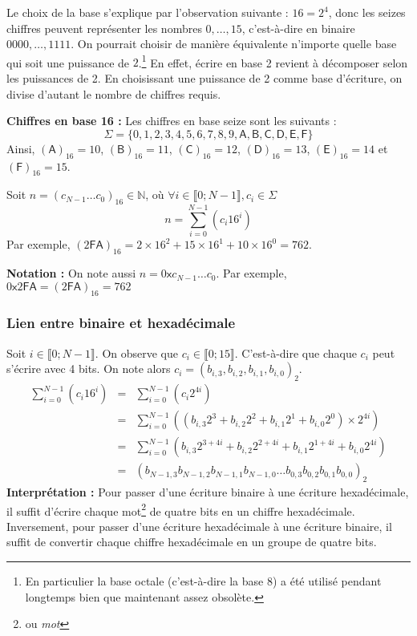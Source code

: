 \documentclass[../../main.tex]{subfiles}
\begin{document}
Le choix de la base s'explique par l'observation suivante : $16 = 2^{4}$, donc les seizes chiffres peuvent représenter les nombres $0, \dots, 15$, c'est-à-dire en binaire $0000, \dots, 1111$. On pourrait choisir de manière équivalente n'importe quelle base qui soit une puissance de $2$.\footnote{En particulier la base octale (c'est-à-dire la base 8) a été utilisé pendant longtemps bien que maintenant assez obsolète.} En effet, écrire en base 2 revient à décomposer selon les puissances de 2. En choisissant une puissance de 2 comme base d'écriture, on divise d'autant le nombre de chiffres requis.

\textbf{Chiffres en base 16 :} Les chiffres en base seize sont les suivants :
$$\Sigma = \{0, 1, 2, 3, 4, 5, 6, 7, 8, 9, \textsf{A}, \textsf{B}, \textsf{C}, \textsf{D}, \textsf{E}, \textsf{F}\}$$
Ainsi, $(\textsf{A})_{16} = 10$, $(\textsf{B})_{16} = 11$, $(\textsf{C})_{16} = 12$, $(\textsf{D})_{16} = 13$, $(\textsf{E})_{16} = 14$ et $(\textsf{F})_{16} = 15$.

Soit $n = (c_{N-1}\dots c_{0})_{16}\in{\mathbb{N}}$, où $\forall{i\in{\llbracket0; N-1\rrbracket}}, c_{i}\in{\Sigma}$
$$n = \displaystyle\sum_{i = 0}^{N-1}\left(c_{i}16^{i}\right)$$ 
Par exemple, $(2\textsf{FA})_{16} = 2\times{16^{2}} + 15\times{16^{1}} + 10\times{16^{0}} = 762$.

\textbf{Notation :} On note aussi $n = 0\textsf{x}c_{N-1}\dots c_{0}$. Par exemple, $0\textsf{x}2\textsf{FA} = (2\textsf{FA})_{16} = 762$

\subsubsection{Lien entre binaire et hexadécimale} \label{ssub:lien_entre_binaire_et_hexad_cimale}

Soit $i\in{\llbracket 0; N-1\rrbracket}$. On observe que $c_{i}\in{\llbracket 0; 15\rrbracket}$. C'est-à-dire que chaque $c_{i}$ peut s'écrire avec 4 bits. On note alors $c_{i} = (b_{i, 3}, b_{i, 2}, b_{i, 1}, b_{i, 0})_{2}$.
$$
\begin{array}{lcl}
\displaystyle\sum_{i = 0}^{N-1}\left(c_{i}16^{i}\right) & = & \displaystyle\sum_{i = 0}^{N-1}\left(c_{i}2^{4i}\right) \\
 & = & \displaystyle\sum_{i = 0}^{N-1}\left((b_{i, 3}2^{3} + b_{i, 2}2^{2} + b_{i, 1}2^{1} + b_{i, 0}2^{0})\times2^{4i}\right) \\
 & = & \displaystyle\sum_{i = 0}^{N-1}\left(b_{i, 3}2^{3 + 4i} + b_{i, 2}2^{2 + 4i} + b_{i, 1}2^{1 + 4i} + b_{i, 0}2^{4i}\right) \\
 & = & (b_{N-1, 3}b_{N-1, 2}b_{N-1, 1}b_{N-1, 0}\dots b_{0, 3}b_{0, 2}b_{0, 1}b_{0, 0})_{2}
\end{array}
$$
\textbf{Interprétation :} Pour passer d'une écriture binaire à une écriture hexadécimale, il suffit d'écrire chaque mot\footnote{ou \textit{mot}} de quatre bits en un chiffre hexadécimale. Inversement, pour passer d'une écriture hexadécimale à une écriture binaire, il suffit de convertir chaque chiffre hexadécimale en un groupe de quatre bits.
\end{document}
